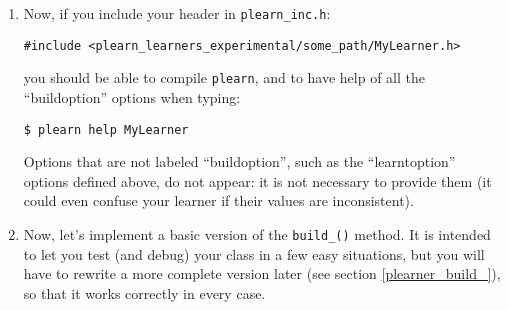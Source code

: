\documentclass[11pt]{book}
\begin{document}
\begin{enumerate}
\begin{verbatim}
    // First, the public build options
    declareOption(ol, "init_params", &MyLearner::init_params,
                  OptionBase::buildoption,
                  "Initial parameters");

    declareOption(ol, "learning_method", &MyLearner::learning_method,
                  OptionBase::buildoption,
                  "Method to use for performing learning.\n"
                  "One of:\n"
                  "  - "none": use raw data\n"
                  "  - "first": first method\n"
                  "  - "second": second method\n");

    // Then, the learned options
    declareOption(ol, "nparams", &MyLearner::nparams,
                  OptionBase::learntoption,
                  "Number of initial parameters");

    declareOption(ol, "method", &MyLearner::method,
                  OptionBase::learntoption,
                  "'learning_method' as a number:\n"
                  "0 for none, 1 for first, 2 for second.\n");

    declareOption(ol, "learned_params", &MyLearner::learned_params,
                  OptionBase::learntoption,
                  "Learned parameters: a matrix of size (nparams ×"
                  " inputsize())");

    // Now call the parent class' declareOptions
    inherited::declareOptions(ol);
}
\end{verbatim}

\item Now, if you include your header in {\tt plearn\_inc.h}:
\begin{verbatim}
#include <plearn_learners_experimental/some_path/MyLearner.h>
\end{verbatim}
you should be able to compile {\tt plearn}, and to have help of all the
“buildoption” options when typing:
\begin{verbatim}
$ plearn help MyLearner
\end{verbatim}
Options that are not labeled “buildoption”, such as the
“learntoption” options defined above, do not appear: it is not
necessary to provide them (it could even confuse your learner if their
values are inconsistent).

\item Now, let's implement a basic version of the {\tt build\_()}
method. It is intended to let you test (and debug) your class in a few
easy situations, but you will have to rewrite a more complete version
later (see section \ref{plearner_build_}), so that it works correctly in
every case.


\end{enumerate}
\end{document}
